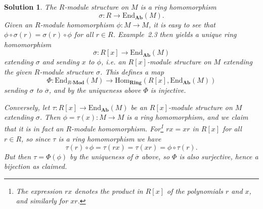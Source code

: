\documentclass[article, a4paper, 11pt, oneside]{memoir}
\numberwithin{equation}{chapter}
\newcommand{\scat}[1]{\mathbf{#1}} %
\newcommand{\ncat}[1]{\mathbf{#1}} %
\newcommand{\catAb}{\ncat{Ab}} %
\newcommand{\catRing}{\ncat{Ring}} %
\newcommand{\catMod}[1]{{#1\text{-}\scat{Mod}}}
\newcommand{\catRMod}{\catMod{R}}
\newcommand{\End}{\mathrm{End}}
\newcommand{\Hom}{\mathrm{Hom}}
\theoremstyle{nonumberplain}
\newtheorem{solution}{Solution}
\begin{document}
\begin{solution}
    The $R$-module structure on $M$ is a ring homomorphism
    \begin{equation*}
        \sigma \colon R \to \End_\catAb(M).
    \end{equation*}
    Given an $R$-module homomorphism $\phi \colon M \to M$, it is easy to see that $\phi \circ \sigma(r) = \sigma(r) \circ \phi$ for all $r \in R$. Example~2.3 then yields a unique ring homomorphism
    \begin{equation*}
        \overline\sigma \colon R[x] \to \End_\catAb(M)
    \end{equation*}
    extending $\sigma$ and sending $x$ to $\phi$, i.e. an $R[x]$-module structure on $M$ extending the given $R$-module structure $\sigma$. This defines a map
    \begin{equation*}
        \Phi \colon \End_\catRMod(M)
            \to \Hom_\catRing(R[x], \End_\catAb(M))
    \end{equation*}
    sending $\sigma$ to $\overline\sigma$, and by the uniqueness above $\Phi$ is injective.

    Conversely, let $\tau \colon R[x] \to \End_\catAb(M)$ be an $R[x]$-module structure on $M$ extending $\sigma$. Then $\phi = \tau(x) \colon M \to M$ is a ring homomorphism, and we claim that it is in fact an $R$-module homomorphism. For\footnote{The expression $rx$ denotes the product in $R[x]$ of the polynomials $r$ and $x$, and similarly for $xr$.} $rx = xr$ in $R[x]$ for all $r \in R$, so since $\tau$ is a ring homomorphism we have
    \begin{equation*}
        \tau(r) \circ \phi
            = \tau(rx)
            = \tau(xr)
            = \phi \circ \tau(r).
    \end{equation*}
    But then $\tau = \Phi(\phi)$ by the uniqueness of $\overline\sigma$ above, so $\Phi$ is also surjective, hence a bijection as claimed.
\end{solution}
\end{document}
